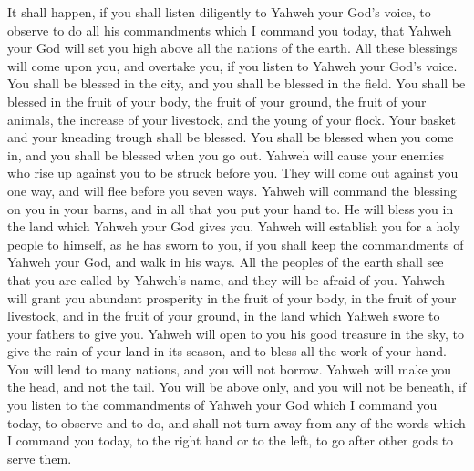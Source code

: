  It shall happen, if you shall listen diligently to Yahweh
your God's voice, to observe to do all his commandments which I command
you today, that Yahweh your God will set you high above all the nations
of the earth.  All these blessings will come upon you, and
overtake you, if you listen to Yahweh your God's voice.  You
shall be blessed in the city, and you shall be blessed in the field.
 You shall be blessed in the fruit of your body, the fruit
of your ground, the fruit of your animals, the increase of your
livestock, and the young of your flock.  Your basket and
your kneading trough shall be blessed.  You shall be blessed
when you come in, and you shall be blessed when you go out. 
Yahweh will cause your enemies who rise up against you to be struck
before you. They will come out against you one way, and will flee before
you seven ways.  Yahweh will command the blessing on you in
your barns, and in all that you put your hand to. He will bless you in
the land which Yahweh your God gives you.  Yahweh will
establish you for a holy people to himself, as he has sworn to you, if
you shall keep the commandments of Yahweh your God, and walk in his
ways.  All the peoples of the earth shall see that you are
called by Yahweh's name, and they will be afraid of you. 
Yahweh will grant you abundant prosperity in the fruit of your body, in
the fruit of your livestock, and in the fruit of your ground, in the
land which Yahweh swore to your fathers to give you. 
Yahweh will open to you his good treasure in the sky, to give the rain
of your land in its season, and to bless all the work of your hand. You
will lend to many nations, and you will not borrow.  Yahweh
will make you the head, and not the tail. You will be above only, and
you will not be beneath, if you listen to the commandments of Yahweh
your God which I command you today, to observe and to do, 
and shall not turn away from any of the words which I command you today,
to the right hand or to the left, to go after other gods to serve them.

